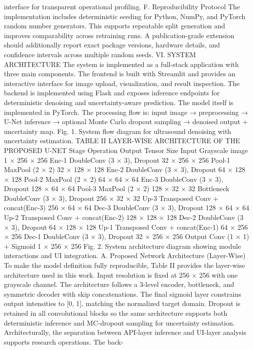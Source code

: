 interface for transparent operational profiling.
F. Reproducibility Protocol
The implementation includes deterministic seeding for
Python, NumPy, and PyTorch random number generators. This
supports repeatable split generation and improves comparability across retraining runs. A publication-grade extension
should additionally report exact package versions, hardware
details, and confidence intervals across multiple random seeds.
VI. SYSTEM ARCHITECTURE
The system is implemented as a full-stack application with
three main components. The frontend is built with Streamlit
and provides an interactive interface for image upload, visualization, and result inspection. The backend is implemented
using Flask and exposes inference endpoints for deterministic
denoising and uncertainty-aware prediction. The model itself
is implemented in PyTorch.
The processing flow is: input image → preprocessing →
U-Net inference → optional Monte Carlo dropout sampling
→ denoised output + uncertainty map.
Fig. 1. System flow diagram for ultrasound denoising with uncertainty
estimation.
TABLE II
LAYER-WISE ARCHITECTURE OF THE PROPOSED U-NET
Stage Operation Output Tensor Size
Input Grayscale image 1 × 256 × 256
Enc-1 DoubleConv (3 × 3), Dropout 32 × 256 × 256
Pool-1 MaxPool (2 × 2) 32 × 128 × 128
Enc-2 DoubleConv (3 × 3), Dropout 64 × 128 × 128
Pool-2 MaxPool (2 × 2) 64 × 64 × 64
Enc-3 DoubleConv (3 × 3), Dropout 128 × 64 × 64
Pool-3 MaxPool (2 × 2) 128 × 32 × 32
Bottleneck DoubleConv (3 × 3), Dropout 256 × 32 × 32
Up-3 Transposed Conv + concat(Enc-3) 256 × 64 × 64
Dec-3 DoubleConv (3 × 3), Dropout 128 × 64 × 64
Up-2 Transposed Conv + concat(Enc-2) 128 × 128 × 128
Dec-2 DoubleConv (3 × 3), Dropout 64 × 128 × 128
Up-1 Transposed Conv + concat(Enc-1) 64 × 256 × 256
Dec-1 DoubleConv (3 × 3), Dropout 32 × 256 × 256
Output Conv (1 × 1) + Sigmoid 1 × 256 × 256
Fig. 2. System architecture diagram showing module interactions and UI
integration.
A. Proposed Network Architecture (Layer-Wise)
To make the model definition fully reproducible, Table II
provides the layer-wise architecture used in this work. Input
resolution is fixed at 256 × 256 with one grayscale channel.
The architecture follows a 3-level encoder, bottleneck, and
symmetric decoder with skip concatenations.
The final sigmoid layer constrains output intensities to [0, 1],
matching the normalized target domain. Dropout is retained
in all convolutional blocks so the same architecture supports
both deterministic inference and MC-dropout sampling for
uncertainty estimation.
Architecturally, the separation between API-layer inference
and UI-layer analysis supports research operations. The back-
